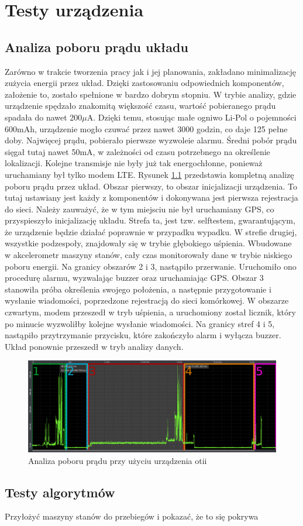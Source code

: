 \chapter{Testy urządzenia}
\section{Analiza poboru prądu układu}
Zarówno w trakcie tworzenia pracy jak i jej planowania, zakładano minimalizację zużycia energii przez układ. Dzięki zastosowaniu odpowiednich komponentów, założenie to, zostało spełnione w bardzo dobrym stopniu. W trybie analizy, gdzie urządzenie spędzało znakomitą większość czasu, wartość pobieranego prądu spadała do nawet 200$\mu$A. Dzięki temu, stosując małe ogniwo Li-Pol o pojemności 600mAh, urządzenie mogło czuwać przez nawet 3000 godzin, co daje 125 pełne doby. Najwięcej prądu, pobierało pierwsze wyzwoleie alarmu. Średni pobór prądu sięgał tutaj nawet 50mA, w zależności od czasu potrzebnego na określenie lokalizacji. Kolejne transmisje nie były już tak energochłonne, ponieważ uruchamiany był tylko modem LTE.
\newline
Rysunek \ref{img:current_summary} przedstawia kompletną analizę poboru prądu przez układ. Obszar pierwszy, to obszar inicjalizacji urządzenia. To tutaj ustawiany jest każdy z komponentów i dokonywana jest pierwsza rejestracja do sieci. Należy zauważyć, że w tym miejsciu nie był uruchamiany GPS, co przyspieszyło inicjalizację układu. Strefa ta, jest tzw. selftestem, gwarantującym, że urządzenie będzie działać poprawnie w przypadku wypadku. W strefie drugiej, wszystkie podzespoły, znajdowały się w trybie głębokiego uśpienia. Wbudowane w akcelerometr maszyny stanów, cały czas monitorowały dane w trybie niskiego poboru energii. Na granicy obszarów 2 i 3, nastąpiło przerwanie. Uruchomiło ono procedurę alarmu, wyzwalając buzzer oraz uruchamiając GPS. Obszar 3 stanowiła próba określenia swojego położenia, a następnie przygotowanie i wysłanie wiadomości, poprzedzone rejestracją do sieci komórkowej. W obszarze czwartym, modem przeszedł w tryb uśpienia, a uruchomiony został licznik, który po minucie wyzwoliłby kolejne wysłanie wiadomości. Na granicy stref 4 i 5, nastąpiło przytrzymanie przycisku, które zakończyło alarm i wyłącza buzzer. Układ ponownie przeszedł w tryb analizy danych.
	

\begin{figure}[h]
    \centering
    \includegraphics[width=14cm]{Graphics/connection_with_fix_divided.png}
    \caption{Analiza poboru prądu przy użyciu urządzenia otii}
    \label{img:current_summary}
\end{figure}

\section{Testy algorytmów}
Przyłożyć maszyny stanów do przebiegów i pokazać, że to się pokrywa